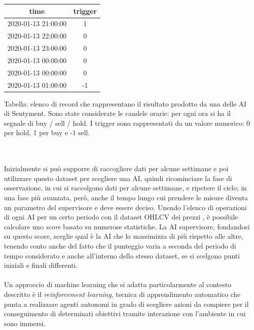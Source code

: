 \documentclass[a4paper,12pt]{report}
\begin{document}
\begin{fig}
    \begin{center}
    	\begin{tabular}{||c c ||} 
    		\hline
    		time & trigger \\ [0.5ex] 
    		\hline\hline
    		2020-01-13 21:00:00 & 1 \\
    		\hline
    		2020-01-13 22:00:00 & 0 \\
    		\hline
    		2020-01-13 23:00:00 & 0 \\
    		\hline
    		2020-01-13 00:00:00 & 0 \\
    		\hline
    		2020-01-13 00:00:00 & 0 \\
    		\hline
    		2020-01-13 01:00:00 & -1 \\ [1ex] 
    		\hline
    	\end{tabular}
    \end{center}
	\caption{Tabella: elenco di record che rappresentano il risultato prodotto da una delle AI di Sentyment. Sono state considerate le candele orarie: per ogni ora si ha il segnale di buy / sell / hold. I trigger sono rappresentati da un valore numerico: 0 per hold, 1 per buy e -1 sell.}

\end{fig}
\\~\\
Inizialmente si può supporre di raccogliere dati per alcune settimane e poi utilizzare questo dataset per scegliere una AI, quindi ricominciare la fase di osservazione, in cui si raccolgono dati per alcune settimane, e ripetere il ciclo; in una fase più avanzata, però, anche il tempo lungo cui prendere le misure diventa un parametro del supervisore e deve essere deciso.
Unendo l'elenco di operazioni di ogni AI per un certo periodo con il dataset OHLCV dei prezzi%
, è possibile calcolare uno \textit{score} basato su numerose statistiche. La AI supervisore, fondandosi su questo score, sceglie qual è la AI che lo massimizza di più rispetto alle altre, tenendo conto anche del fatto che il punteggio varia a seconda del periodo di tempo considerato e anche all'interno dello stesso dataset, se si scelgono punti iniziali e finali differenti.\\~\\
Un approccio di machine learning che si adatta particolarmente al contesto descritto è il \textit{reinforcement learning}, tecnica di apprendimento automatico che punta a realizzare agenti autonomi in grado di scegliere azioni da compiere per il conseguimento di determinati obiettivi tramite interazione con l'ambiente in cui sono immersi.
\end{document}
